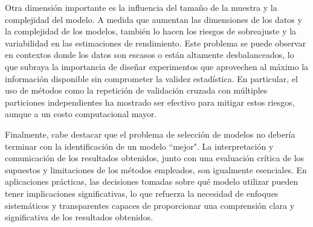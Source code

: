 \documentclass[a4paper,12pt]{article}
\begin{document}
Otra dimensión importante es la influencia del tamaño de la muestra y la complejidad del modelo. A medida que aumentan las dimensiones de los datos y la complejidad de los modelos, también lo hacen los riesgos de sobreajuste y la variabilidad en las estimaciones de rendimiento. Este problema se puede observar en contextos donde los datos son escasos o están altamente desbalanceados, lo que subraya la importancia de diseñar experimentos que aprovechen al máximo la información disponible sin comprometer la validez estadística. En particular, el uso de métodos como la repetición de validación cruzada con múltiples particiones independientes ha mostrado ser efectivo para mitigar estos riesgos, aunque a un costo computacional mayor.

Finalmente, cabe destacar que el problema de selección de modelos no debería terminar con la identificación de un modelo ``mejor". La interpretación y comunicación de los resultados obtenidos, junto con una evaluación crítica de los supuestos y limitaciones de los métodos empleados, son igualmente esenciales. En aplicaciones prácticas, las decisiones tomadas sobre qué modelo utilizar pueden tener implicaciones significativas, lo que refuerza la necesidad de enfoques sistemáticos y transparentes capaces de proporcionar una comprensión clara y significativa de los resultados obtenidos.
\newpage


\end{document}
